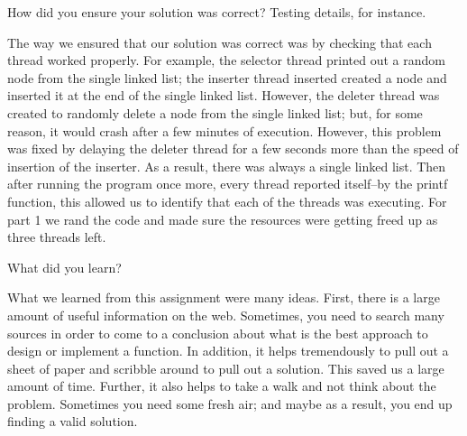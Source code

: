 \documentclass{article}
\newenvironment{question}[2][Question]{\begin{trivlist}
\item[\hskip \labelsep {\bfseries #1}\hskip \labelsep {\bfseries #2.}]}{\end{trivlist}}
\begin{document}

\vspace{0.25in} %

\begin{question}{3}
How did you ensure your solution was correct? Testing details, for instance.
\end{question}
The way we ensured that our solution was correct was by checking that each thread worked properly. For example, the selector thread printed out a random node from the single linked list; the inserter thread inserted created a node and inserted it at the end of the single linked list. However, the deleter thread was created to randomly delete a node from the single linked list; but, for some reason, it would crash after a few minutes of execution. However, this problem was fixed by delaying the deleter thread for a few seconds more than the speed of insertion of the inserter. As a result, there was always a single linked list. Then after running the program once more, every thread reported itself--by the printf function, this allowed us to identify that each of the threads was executing. For part 1 we rand the code and made sure the resources were getting freed up as three threads left.

\newpage


\vspace{0.25in}
\begin{question}{4}
What did you learn?
\end{question}
What we learned from this assignment were many ideas. First, there is a large amount of useful information on the web. Sometimes, you need to search many sources in order to come to a conclusion about what is the best approach to design or implement a function. In addition, it helps tremendously to pull out a sheet of paper and scribble around to pull out a solution. This saved us a large amount of time. Further, it also helps to take a walk and not think about the problem. Sometimes you need some fresh air; and maybe as a result, you end up finding a valid solution.

\end{document}
